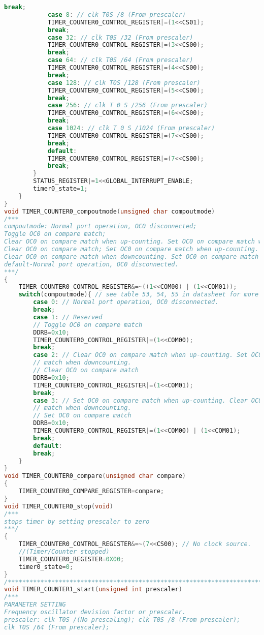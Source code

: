 \begin{lstlisting}[language=C]
			break;
			case 8: // clk T0S /8 (From prescaler)
			TIMER_COUNTER0_CONTROL_REGISTER|=(1<<CS01);
			break;
			case 32: // clk T0S /32 (From prescaler)
			TIMER_COUNTER0_CONTROL_REGISTER|=(3<<CS00);
			break;
			case 64: // clk T0S /64 (From prescaler)
			TIMER_COUNTER0_CONTROL_REGISTER|=(4<<CS00);
			break;
			case 128: // clk T0S /128 (From prescaler)
			TIMER_COUNTER0_CONTROL_REGISTER|=(5<<CS00);
			break;
			case 256: // clk T 0 S /256 (From prescaler)
			TIMER_COUNTER0_CONTROL_REGISTER|=(6<<CS00);
			break;
			case 1024: // clk T 0 S /1024 (From prescaler)
			TIMER_COUNTER0_CONTROL_REGISTER|=(7<<CS00);
			break;
			default:
			TIMER_COUNTER0_CONTROL_REGISTER|=(7<<CS00);
			break;
		}
		STATUS_REGISTER|=1<<GLOBAL_INTERRUPT_ENABLE;
		timer0_state=1;
	}	
}
void TIMER_COUNTER0_compoutmode(unsigned char compoutmode)
/***
compoutmode: Normal port operation, OC0 disconnected;
Toggle OC0 on compare match; 
Clear OC0 on compare match when up-counting. Set OC0 on compare match when downcounting.
Clear OC0 on compare match; Set OC0 on compare match when up-counting.
Clear OC0 on compare match when downcounting. Set OC0 on compare match ;
default-Normal port operation, OC0 disconnected.
***/
{
	TIMER_COUNTER0_CONTROL_REGISTER&=~((1<<COM00) | (1<<COM01));
	switch(compoutmode){ // see table 53, 54, 55 in datasheet for more information
		case 0: // Normal port operation, OC0 disconnected.
		break;
		case 1: // Reserved
		// Toggle OC0 on compare match
		DDRB=0x10;
		TIMER_COUNTER0_CONTROL_REGISTER|=(1<<COM00);
		break;
		case 2: // Clear OC0 on compare match when up-counting. Set OC0 on compare
		// match when downcounting.
		// Clear OC0 on compare match
		DDRB=0x10;
		TIMER_COUNTER0_CONTROL_REGISTER|=(1<<COM01);
		break;
		case 3: // Set OC0 on compare match when up-counting. Clear OC0 on compare
		// match when downcounting.
		// Set OC0 on compare match
		DDRB=0x10;
		TIMER_COUNTER0_CONTROL_REGISTER|=(1<<COM00) | (1<<COM01);
		break;
		default:
		break;
	}
}
void TIMER_COUNTER0_compare(unsigned char compare)
{
	TIMER_COUNTER0_COMPARE_REGISTER=compare;
}
void TIMER_COUNTER0_stop(void)
/***
stops timer by setting prescaler to zero
***/
{
	TIMER_COUNTER0_CONTROL_REGISTER&=~(7<<CS00); // No clock source.
	//(Timer/Counter stopped)
	TIMER_COUNTER0_REGISTER=0X00;
	timer0_state=0;
}
/*****************************************************************************************/
void TIMER_COUNTER1_start(unsigned int prescaler)
/***
PARAMETER SETTING
Frequency oscillator devision factor or prescaler.
prescaler: clk T0S /(No prescaling); clk T0S /8 (From prescaler);
clk T0S /64 (From prescaler);

\end{lstlisting}
